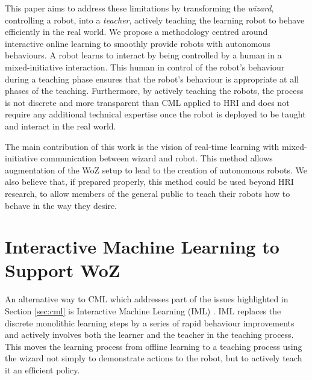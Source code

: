 \documentclass[manuscript, review, anonymous]{acmart}
\newcommand{\ES}[1]{\added[id=ES]{#1}}
\newcommand{\woz}{WoZ++\xspace}
\begin{document}

This paper aims to address these limitations by transforming the \emph{wizard}, controlling 
a robot, into a \emph{teacher}, actively teaching the learning robot to behave efficiently in the 
real world. We propose a methodology centred around interactive online learning to smoothly
provide robots with autonomous behaviours. A robot learns to interact by being
controlled by a human in a mixed-initiative interaction. This human in control
of the robot's behaviour during a teaching phase ensures that the robot's
behaviour is appropriate at all phases of the teaching. Furthermore, by actively
teaching the robots, the process is not discrete and more transparent than CML
applied to HRI and does not require any additional technical expertise once the
robot is deployed to be taught and interact in the real world.

The main contribution of this work is the vision of real-time learning with mixed-initiative communication between wizard and robot. This method allows augmentation of the WoZ setup to lead to
the creation of autonomous robots.
We also believe that, if prepared properly, this method could be used beyond HRI research,
to allow members of the general public to teach their robots how to behave in the way they
desire.

\section{Interactive Machine Learning to Support WoZ}


An alternative way to CML which addresses part of the issues highlighted in
Section \ref{sec:cml} is Interactive Machine Learning (IML)
\cite{fails2003interactive,amershi2014power}.  IML replaces the discrete
monolithic learning steps by a series of rapid behaviour improvements and
actively involves both the learner and the teacher in the teaching process.  This
moves the learning process from offline learning to a teaching process using the
wizard not simply to demonstrate actions to the robot, but to actively teach it
an efficient policy.
\end{document}
